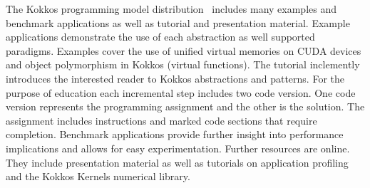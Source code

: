 
The Kokkos programming model distribution~\cite{CITEKOKKOSGIT} includes many examples and benchmark applications as well as tutorial and presentation material. Example applications demonstrate the use of each abstraction as well supported paradigms. Examples cover the use of unified virtual memories on CUDA devices and object polymorphism in Kokkos (virtual functions). The tutorial inclemently introduces the interested reader to Kokkos abstractions and patterns. For the purpose of education each incremental step includes two code version. One code version represents the programming assignment and the other is the solution. The assignment includes instructions and marked code sections that require completion. Benchmark applications provide further insight into performance implications and allows for easy experimentation. Further resources are online\cite{CITEKOKKOSTUTORIALS}. They include presentation material as well as tutorials on application profiling and the Kokkos Kernels numerical library.